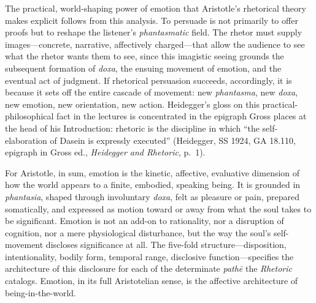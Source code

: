 \documentclass{article}
\begin{document}
The practical, world-shaping power of emotion that Aristotle's rhetorical theory makes explicit follows from this analysis. To persuade is not primarily to offer proofs but to reshape the listener's \textit{phantasmatic} field. The rhetor must supply images---concrete, narrative, affectively charged---that allow the audience to see what the rhetor wants them to see, since this imagistic seeing grounds the subsequent formation of \textit{doxa}, the ensuing movement of emotion, and the eventual act of judgment. If rhetorical persuasion succeeds, accordingly, it is because it sets off the entire cascade of movement: new \textit{phantasma}, new \textit{doxa}, new emotion, new orientation, new action. Heidegger's gloss on this practical-philosophical fact in the lectures is concentrated in the epigraph Gross places at the head of his Introduction: rhetoric is the discipline in which ``the self-elaboration of Dasein is expressly executed'' (Heidegger, SS 1924, GA 18.110, epigraph in Gross ed., \textit{Heidegger and Rhetoric}, p.~1).

For Aristotle, in sum, emotion is the kinetic, affective, evaluative dimension of how the world appears to a finite, embodied, speaking being. It is grounded in \textit{phantasia}, shaped through involuntary \textit{doxa}, felt as pleasure or pain, prepared somatically, and expressed as motion toward or away from what the soul takes to be significant. Emotion is not an add-on to rationality, nor a disruption of cognition, nor a mere physiological disturbance, but the way the soul's self-movement discloses significance at all. The five-fold structure---disposition, intentionality, bodily form, temporal range, disclosive function---specifies the architecture of this disclosure for each of the determinate \textit{pathē} the \textit{Rhetoric} catalogs. Emotion, in its full Aristotelian sense, is the affective architecture of being-in-the-world.
\end{document}
